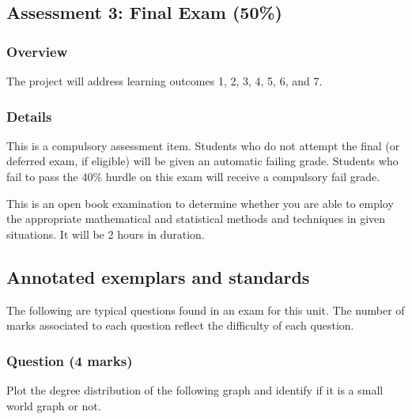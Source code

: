 \documentclass{uws_learning_guide}
\begin{document}
\subsection{Assessment 3: Final Exam (50\%)}

\subsubsection{Overview}

The project will address learning outcomes 1, 2, 3, 4, 5, 6, and 7.

\subsubsection{Details}

This is a compulsory assessment item. Students who do not attempt the
final (or deferred exam, if eligible) will be given an automatic
failing grade.  Students who fail to pass the 40\% hurdle on this exam
will receive a compulsory fail grade.

This is an open book examination to determine whether you are able to
employ the appropriate mathematical and statistical methods and
techniques in given situations. It will be 2 hours in duration.




\subsection{\hintlogo{} Annotated exemplars and standards}

The following are typical questions found in an exam for this
unit. The number of marks associated to each question reflect the
difficulty of each question.


\subsubsection*{Question (4 marks)}

Plot the degree distribution of the following graph and identify if it
is a small world graph or not.
\end{document}
